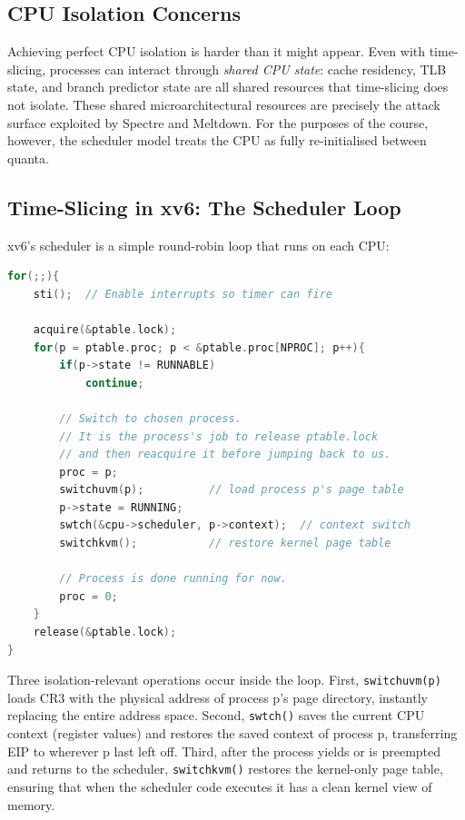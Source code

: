 \documentclass[11pt]{article}
\begin{document}
\subsection{CPU Isolation Concerns}

Achieving perfect CPU isolation is harder than it might appear. Even with time-slicing,
processes can interact through \emph{shared CPU state}: cache residency, TLB state,
and branch predictor state are all shared resources that time-slicing does not isolate.
These shared microarchitectural resources are precisely the attack surface exploited by
Spectre and Meltdown. For the purposes of the course, however, the scheduler model treats
the CPU as fully re-initialised between quanta.

\subsection{Time-Slicing in xv6: The Scheduler Loop}

xv6's scheduler is a simple round-robin loop that runs on each CPU:

\begin{lstlisting}[language=C, caption={proc.c --- the per-CPU scheduler loop}]
for(;;){
    sti();  // Enable interrupts so timer can fire

    acquire(&ptable.lock);
    for(p = ptable.proc; p < &ptable.proc[NPROC]; p++){
        if(p->state != RUNNABLE)
            continue;

        // Switch to chosen process.
        // It is the process's job to release ptable.lock
        // and then reacquire it before jumping back to us.
        proc = p;
        switchuvm(p);          // load process p's page table
        p->state = RUNNING;
        swtch(&cpu->scheduler, p->context);  // context switch
        switchkvm();           // restore kernel page table

        // Process is done running for now.
        proc = 0;
    }
    release(&ptable.lock);
}
\end{lstlisting}

Three isolation-relevant operations occur inside the loop. First, \texttt{switchuvm(p)}
loads CR3 with the physical address of process p's page directory, instantly replacing the
entire address space. Second, \texttt{swtch()} saves the current CPU context (register
values) and restores the saved context of process p, transferring EIP to wherever p last
left off. Third, after the process yields or is preempted and returns to the scheduler,
\texttt{switchkvm()} restores the kernel-only page table, ensuring that when the scheduler
code executes it has a clean kernel view of memory.
\end{document}
